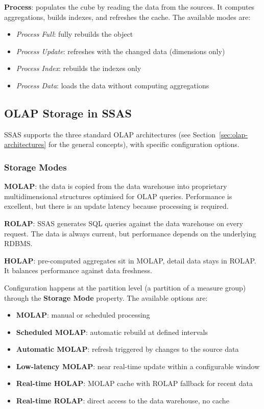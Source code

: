 \textbf{Process}: populates the cube by reading the data from the sources. It computes aggregations, builds indexes, and refreshes the cache. The available modes are:
\begin{itemize}
    \item \textit{Process Full}: fully rebuilds the object
    \item \textit{Process Update}: refreshes with the changed data (dimensions only)
    \item \textit{Process Index}: rebuilds the indexes only
    \item \textit{Process Data}: loads the data without computing aggregations
\end{itemize}

\subsection{OLAP Storage in SSAS}
\label{sec:ssas-storage}

SSAS supports the three standard OLAP architectures (see Section~\ref{sec:olap-architectures} for the general concepts), with specific configuration options.

\subsubsection{Storage Modes}
\label{subsec:ssas-storage-modes}

\textbf{MOLAP}: the data is copied from the data warehouse into proprietary multidimensional structures optimised for OLAP queries. Performance is excellent, but there is an update latency because processing is required.

\textbf{ROLAP}: SSAS generates SQL queries against the data warehouse on every request. The data is always current, but performance depends on the underlying RDBMS.

\textbf{HOLAP}: pre-computed aggregates sit in MOLAP, detail data stays in ROLAP. It balances performance against data freshness.

Configuration happens at the partition level (a partition of a measure group) through the \textbf{Storage Mode} property. The available options are:

\begin{itemize}
    \item \textbf{MOLAP}: manual or scheduled processing
    \item \textbf{Scheduled MOLAP}: automatic rebuild at defined intervals
    \item \textbf{Automatic MOLAP}: refresh triggered by changes to the source data
    \item \textbf{Low-latency MOLAP}: near real-time update within a configurable window
    \item \textbf{Real-time HOLAP}: MOLAP cache with ROLAP fallback for recent data
    \item \textbf{Real-time ROLAP}: direct access to the data warehouse, no cache
\end{itemize}

